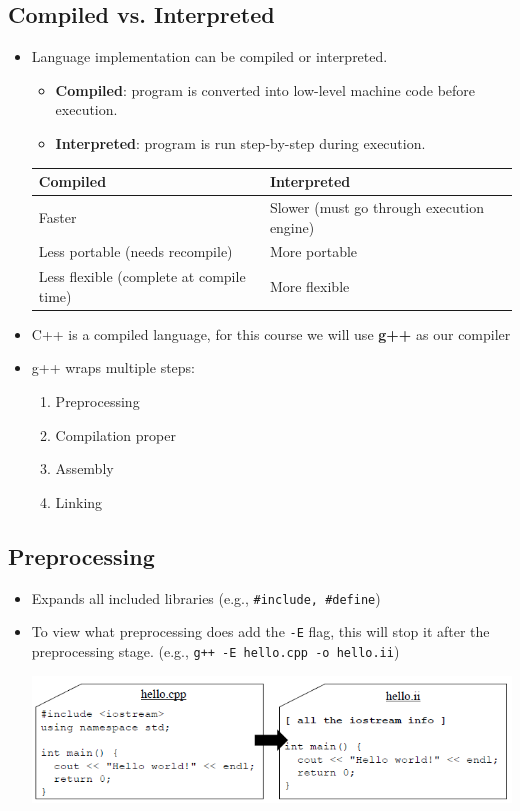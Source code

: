 \subsection{Compiled vs. Interpreted}
\begin{itemize}
	\item Language implementation can be compiled or interpreted.
	\begin{itemize}
	 	\item \textbf{Compiled}: program is converted into low-level machine code before execution.
	 	\item \textbf{Interpreted}: program is run step-by-step during execution.
	 \end{itemize} 
	 \begin{tabular}{l|l}
	 	Compiled & Interpreted \\
	 	\hline
	 	Faster & Slower (must go through execution engine) \\
	 	Less portable (needs recompile) & More portable \\
	 	Less flexible (complete at compile time) & More flexible 	 	
	 \end{tabular}

	 \item C++ is a compiled language, for this course we will use \textbf{g++} as our compiler
	 \item g++ wraps multiple steps:
	 \begin{enumerate}
	 	\item Preprocessing
	 	\item Compilation proper
	 	\item Assembly
	 	\item Linking
	 \end{enumerate}
\end{itemize}

\subsection{Preprocessing}
\begin{itemize}
	\item Expands all included libraries (e.g., \lstinline[style=C++]{#include, #define})
	\item To view what preprocessing does add the \lstinline[style=bash]{-E} flag, this will stop it after the preprocessing stage. (e.g., \lstinline[style=bash]{g++ -E hello.cpp -o hello.ii})
	\begin{center}
		\includegraphics[scale=0.6]{sections/lec1/pre.png}
	\end{center}
\end{itemize}

